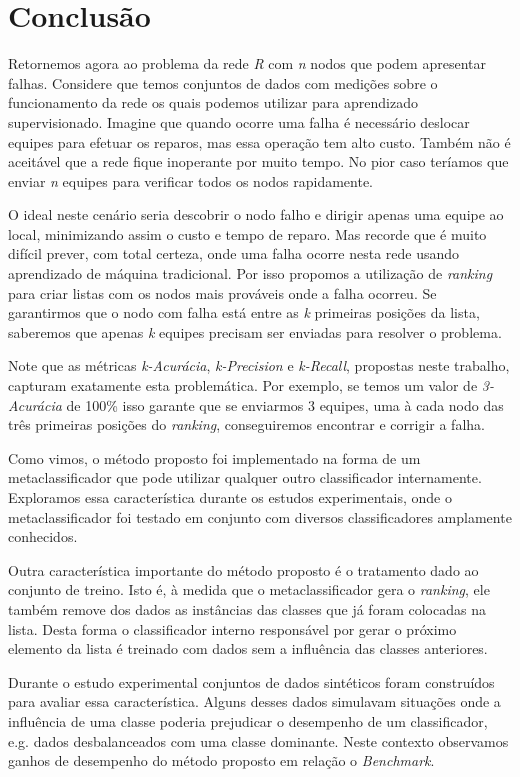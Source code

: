 \chapter{Conclusão}

Retornemos agora ao problema da rede \textit{R} com \textit{n} nodos que podem apresentar falhas.
Considere que temos conjuntos de dados com medições sobre o funcionamento da rede os quais podemos utilizar para aprendizado supervisionado.
Imagine que quando ocorre uma falha é necessário deslocar equipes para efetuar os reparos, mas essa operação tem alto custo.
Também não é aceitável que a rede fique inoperante por muito tempo.
No pior caso teríamos que enviar \textit{n} equipes para verificar todos os nodos rapidamente.

O ideal neste cenário seria descobrir o nodo falho e dirigir apenas uma equipe ao local, minimizando assim o custo e tempo de reparo.
Mas recorde que é muito difícil prever, com total certeza, onde uma falha ocorre nesta rede usando aprendizado de máquina tradicional.
Por isso propomos a utilização de \textit{ranking} para criar listas com os nodos mais prováveis onde a falha ocorreu.
Se garantirmos que o nodo com falha está entre as \textit{k} primeiras posições da lista, saberemos que apenas \textit{k} equipes precisam ser enviadas para resolver o problema.

Note que as métricas \textit{k-Acurácia}, \textit{k-Precision} e \textit{k-Recall}, propostas neste trabalho, capturam exatamente esta problemática.
Por exemplo, se temos um valor de \textit{3-Acurácia} de 100\% isso garante que se enviarmos 3 equipes, uma à cada  nodo das três primeiras posições do \textit{ranking}, conseguiremos encontrar e corrigir a falha.

Como vimos, o método proposto foi implementado na forma de um metaclassificador que pode utilizar qualquer outro classificador internamente.
Exploramos essa característica durante os estudos experimentais, onde o metaclassificador foi testado em conjunto com diversos classificadores amplamente conhecidos.

Outra característica importante do método proposto é o tratamento dado ao conjunto de treino.
Isto é, à medida que o metaclassificador gera o \textit{ranking}, ele também remove dos dados as instâncias das classes que já foram colocadas na lista.
Desta forma o classificador interno responsável por gerar o próximo elemento da lista é treinado com dados sem a influência das classes anteriores.

Durante o estudo experimental conjuntos de dados sintéticos foram construídos para avaliar essa característica.
Alguns desses dados simulavam situações onde a influência de uma classe poderia prejudicar o desempenho de um classificador, e.g. dados desbalanceados com uma classe dominante.
Neste contexto observamos ganhos de desempenho do método proposto em relação o \textit{Benchmark}.

